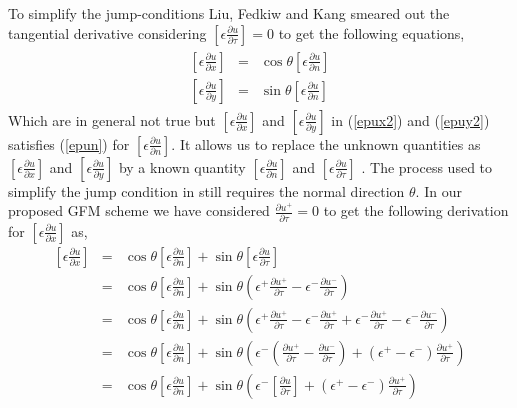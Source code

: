To simplify the jump-conditions Liu, Fedkiw and Kang \cite{Liu2000}  smeared out the tangential derivative considering $\left[\epsilon \frac{\partial u}{\partial \tau}\right]=0$ to get the following equations, 
\begin{eqnarray}
\begin{aligned}
	\left[\epsilon \frac{\partial u}{\partial x}\right] &=& \cos \theta \left[\epsilon \frac{\partial u}{\partial n}\right]\label{epux2}   \\
	\left[\epsilon \frac{\partial u}{\partial y}\right] &=& \sin \theta \left[\epsilon \frac{\partial u}{\partial n}\right] \label{epuy2}
\end{aligned}	
\end{eqnarray}
Which are in general not true but $\left[\epsilon \frac{\partial u}{\partial x}\right]$ and $\left[\epsilon \frac{\partial u}{\partial y}\right]$ in (\ref{epux2}) and (\ref{epuy2}) satisfies (\ref{epun}) for $\left[\epsilon \frac{\partial u}{\partial n}\right]$. It allows us to replace the unknown quantities as  $\left[\epsilon \frac{\partial u}{\partial x}\right]$ and $\left[\epsilon \frac{\partial u}{\partial y}\right]$ by a known quantity $\left[\epsilon \frac{\partial u}{\partial n}\right]$ and $\left[\epsilon \frac{\partial u}{\partial \tau}\right]$   . The process used to simplify the jump condition in \cite{Liu2000} still requires the normal direction $\theta$. In our proposed GFM scheme  we have considered $\frac{\partial u^+}{\partial \tau}=0$ to get the following derivation for $ \left[\epsilon \frac{\partial u}{\partial x}\right] $ as, 
\begin{eqnarray*}
\left[\epsilon \frac{\partial u}{\partial x}\right] &=& \cos \theta \left[\epsilon \frac{\partial u}{\partial n}\right] +\sin \theta \left[\epsilon \frac{\partial u}{\partial \tau}\right]\\
&=& \cos \theta \left[\epsilon \frac{\partial u}{\partial n}\right] +\sin \theta \left(\epsilon^+\frac{\partial u^+}{\partial \tau}-\epsilon^-\frac{\partial u^-}{\partial \tau}\right)\\
&=& \cos \theta\left[\epsilon \frac{\partial u}{\partial n}\right]+\sin \theta \left(\epsilon^+\frac{\partial u^+}{\partial \tau}-\epsilon^-\frac{\partial u^+}{\partial \tau}+\epsilon^-\frac{\partial u^+}{\partial \tau}-\epsilon^-\frac{\partial u^-}{\partial \tau}\right)\\
&=&\cos \theta\left[\epsilon \frac{\partial u}{\partial n}\right]+\sin \theta \left(\epsilon^-\left(\frac{\partial u^+}{\partial \tau}-\frac{\partial u^-}{\partial \tau}\right)+(\epsilon^+-\epsilon^-)\frac{\partial u^+}{\partial \tau}\right)\\
&=&\cos \theta\left[\epsilon \frac{\partial u}{\partial n}\right]+\sin \theta \left(\epsilon^-\left[\frac{\partial u}{\partial \tau}\right]+(\epsilon^+-\epsilon^-)\frac{\partial u^+}{\partial \tau}\right)\\
\end{eqnarray*}
